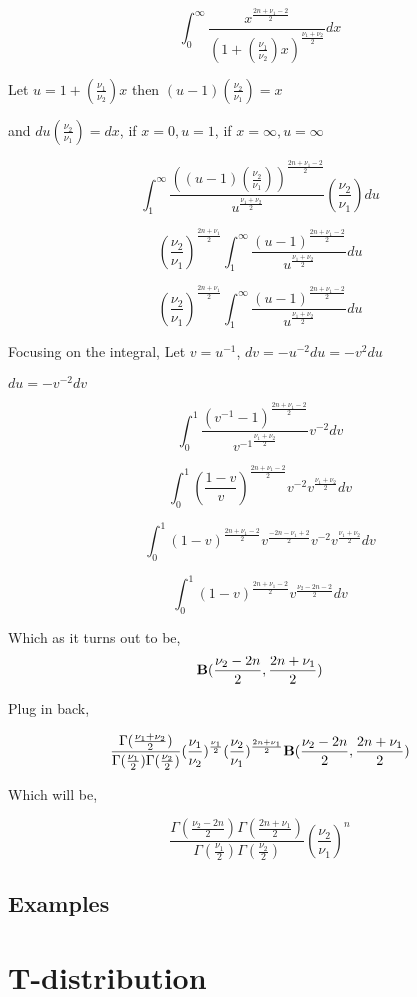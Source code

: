 \documentclass{article}
\begin{document}
$$\int_{0}^{\infty} \frac{x^{\frac{2n+\nu_1-2}{2}}}{(1+(\frac{\nu_1}{\nu_2})x)^{\frac{\nu_1+\nu_2}{2}}}dx$$

Let $u = 1+(\frac{\nu_1}{\nu_2})x$ then $(u-1)(\frac{\nu_2}{\nu_1})= x$

and $du(\frac{\nu_2}{\nu_1})= dx$, if $x =0,u=1$, if $x=\infty, u = \infty$

$$\int_{1}^{\infty} \frac{((u-1)(\frac{\nu_2}{\nu_1}))^{\frac{2n+\nu_1-2}{2}}}{u^{\frac{\nu_1+\nu_2}{2}}}(\frac{\nu_2}{\nu_1})du$$

$$(\frac{\nu_2}{\nu_1})^{\frac{2n+\nu_1}{2}} \int_{1}^{\infty} \frac{(u-1)^{\frac{2n+\nu_1-2}{2}}}{u^{\frac{\nu_1+\nu_2}{2}}}du$$


$$(\frac{\nu_2}{\nu_1})^{\frac{2n+\nu_1}{2}} \int_{1}^{\infty} \frac{(u-1)^{\frac{2n+\nu_1-2}{2}}}{u^{\frac{\nu_1+\nu_2}{2}}}du$$
 
Focusing on the integral, Let $v =u^{-1}$, $dv = -u^{-2} du = -v^2du$

$du = -v^{-2} dv$

$$\int_{0}^{1} \frac{(v^{-1}-1)^{\frac{2n+\nu_1-2}{2}}}{{v^{-1}}^{\frac{\nu_1+\nu_2}{2}}}v^{-2} dv$$

$$\int_{0}^{1} (\frac{1-v}{v})^{\frac{2n+\nu_1-2}{2}}v^{-2} {{{v}^{\frac{\nu_1+\nu_2}{2}}}} dv$$

$$\int_{0}^{1} ({1-v})^{\frac{2n+\nu_1-2}{2}}v^{\frac{-2n-\nu_1+2}{2}}v^{-2} {{{v}^{\frac{\nu_1+\nu_2}{2}}}} dv$$

$$\int_{0}^{1} ({1-v})^{\frac{2n+\nu_1-2}{2}}v^{\frac{\nu_2-2n-2}{2}}{} dv$$

Which as it turns out to be, 
$${\bf B}(\frac{\nu_2-2n}{2},\frac{2n+\nu_1}{2})$$

Plug in back,

$$\frac{\Gamma(\frac{\nu_1+\nu_2}{2})}{\Gamma(\frac{\nu_1}{2})\Gamma(\frac{\nu_2}{2})} (\frac{\nu_1}{\nu_2})^{\frac{\nu_1}{2}}(\frac{\nu_2}{\nu_1})^{\frac{2n+\nu_1}{2}} {\bf B}(\frac{\nu_2-2n}{2},\frac{2n+\nu_1}{2})$$

Which will be,

$$\frac{\Gamma(\frac{\nu_2-2n}{2})\Gamma(\frac{2n+\nu_1}{2})}{\Gamma(\frac{\nu_1}{2})\Gamma(\frac{\nu_2}{2})} (\frac{\nu_2}{\nu_1})^{n} $$

\subsection{Examples}


\section{T-distribution}
\end{document}
